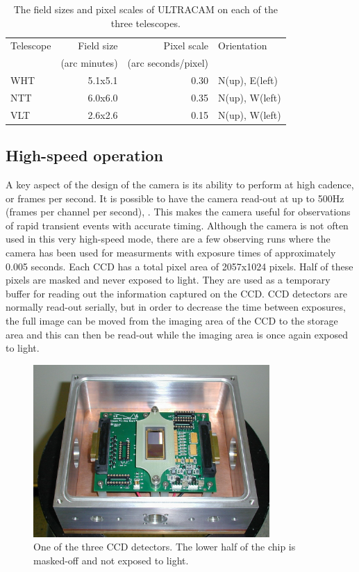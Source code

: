 \begin{table}
	\caption{The field sizes and pixel scales of ULTRACAM on each of the three telescopes.}
	\begin{tabular}{l r r l}
		\hline
		Telescope & Field size        & Pixel scale & Orientation \\
		                  & (arc minutes) &   (arc seconds/pixel) & \\
		\hline
		WHT & 5.1x5.1 & 0.30 & N(up), E(left)\\
		NTT & 6.0x6.0 & 0.35 & N(up), W(left)\\
		VLT & 2.6x2.6 & 0.15 & N(up), W(left)\\
		\hline
	\end{tabular}
	\label{tab:pixelscale}
\end{table}

\subsection{High-speed operation}
A key aspect of the design of the camera is its ability to perform at high cadence, or frames per second. It is possible to have the camera read-out at up to 500Hz (frames per channel per second), \citep{dhillon07}. This makes the camera useful for observations of rapid transient events with accurate timing. Although the camera is not often used in this very high-speed mode, there are a few observing runs where the camera has been used for measurments with exposure times of approximately 0.005 seconds. Each CCD has a total pixel area of 2057x1024 pixels. Half of these pixels are masked and never exposed to light. They are used as a temporary buffer for reading out the information captured on the CCD. CCD detectors are normally read-out serially, but in order to decrease the time between exposures, the full image can be moved from the imaging area of the CCD to the storage area and this can then be read-out while the imaging area is once again exposed to light. 

\begin{figure}
\centering
\includegraphics[width=90mm]{images/ccd.png}
\caption{One of the three CCD detectors. The lower half of the chip is masked-off and not exposed to light.}
\label{fig2}
\end{figure}

